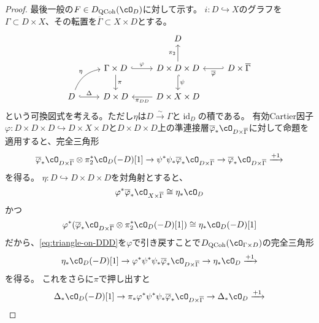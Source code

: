 \documentclass[uplatex, a4paper, dvipdfmx]{jsarticle}
\theoremstyle{definition}
\DeclareMathOperator{\id}{\mathrm{id}}
\DeclareMathOperator{\QCoh}{\mathrm{QCoh}}
\begin{document}
\begin{proof}
    最後一般の$F \in D_{\QCoh}(\cO_D)$に対して示す。
    $i \colon D \hookrightarrow X$のグラフを$\Gamma \subset D \times X$、その転置を$\overline{\Gamma} \subset X \times D$とする。
    \[
        \begin{tikzcd}
            && D &\\
            &\Gamma \times D \ar[r, hook, "\varphi"]\ar[d, "\pi"] &D \times D \times D \ar[d, hook, "\psi"] \ar[u, "\pi_2"] & D \times \overline{\Gamma} \ar[l, hook', "\overline{\varphi}"]\\
            D  \ar[r, hook, "\Delta"] \ar[ru, bend left, "\eta"]&D \times D & D \times X \times D \ar[l, "\pi_{DD}"] &
        \end{tikzcd}
    \]
    という可換図式を考える。ただし$\eta$は$D \xrightarrow{\sim} \Gamma$と$\id_D$の積である。
    有効Cartier因子$\varphi \colon D \times D \times D \hookrightarrow D \times X \times D$と$D \times D \times D$上の準連接層$\overline{\varphi}_*\cO_{D \times \overline{\Gamma}}$に対して命題を適用すると、完全三角形
    \begin{equation}\label{eq:triangle-on-DDD}
        \overline{\varphi}_* \cO_{D \times \overline{\Gamma}}\otimes \pi_2^*\cO_D(-D)[1]\to \psi^*\psi_*\overline{\varphi}_*\cO_{D \times \overline{\Gamma}}\to \overline{\varphi}_*\cO_{D \times \overline{\Gamma}} \xrightarrow{+1}
    \end{equation}
    を得る。
    $\eta \colon D \hookrightarrow D \times D \times D$を対角射とすると、
    \begin{equation}
        \varphi^*\overline{\varphi}_*\cO_{X \times \overline{\Gamma}} \cong \eta_*\cO_D
    \end{equation}
    かつ
    \begin{equation}
        \varphi^*(\overline{\varphi}_* \cO_{D \times \overline{\Gamma}}\otimes \pi_2^*\cO_D(-D)[1]) \cong \eta_*\cO_D(-D)[1]
    \end{equation}
    だから、\eqref{eq:triangle-on-DDD}を$\varphi$で引き戻すことで$D_{\QCoh}(\cO_{\Gamma \times D})$の完全三角形
    \begin{equation}
        \eta_*\cO_D(-D)[1] \to \varphi^*\psi^*\psi_*\overline{\varphi}_*\cO_{D \times \overline{\Gamma}} \to \eta_*\cO_D \xrightarrow{+1}
    \end{equation}
    を得る。
    これをさらに$\pi$で押し出すと
    \begin{equation}
        \Delta_*\cO_D(-D)[1] \to \pi_*\varphi^*\psi^*\psi_*\overline{\varphi}_*\cO_{D \times \overline{\Gamma}} \to \Delta_*\cO_D \xrightarrow{+1}
    \end{equation}

\end{proof}
\end{document}
